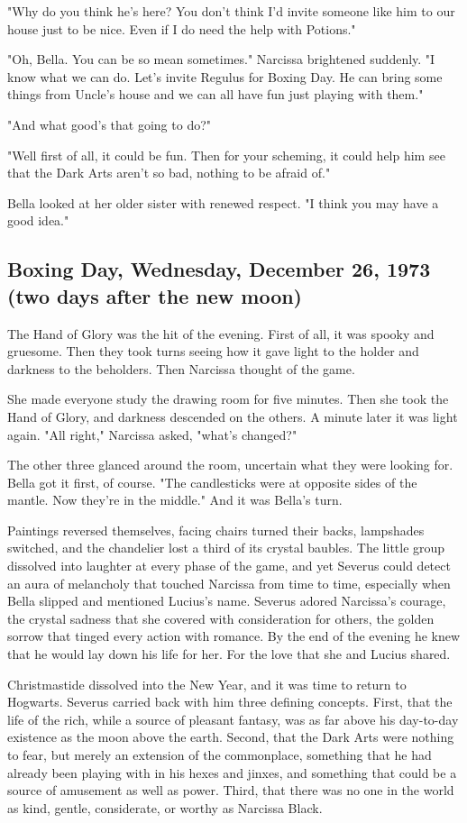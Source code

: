 \documentclass[a4paper,11pt]{article}
\begin{document}
"Why do you think he's here? You don't think I'd invite someone like him to our house just to be nice. Even if I do need the help with Potions."

"Oh, Bella. You can be so mean sometimes." Narcissa brightened suddenly. "I know what we can do. Let's invite Regulus for Boxing Day. He can bring some things from Uncle's house and we can all have fun just playing with them."

"And what good's that going to do?"

"Well first of all, it could be fun. Then for your scheming, it could help him see that the Dark Arts aren't so bad, nothing to be afraid of."

Bella looked at her older sister with renewed respect. "I think you may have a good idea."

\subsection{Boxing Day, Wednesday, December 26, 1973 (two days after the new moon)}

The Hand of Glory was the hit of the evening. First of all, it was spooky and gruesome. Then they took turns seeing how it gave light to the holder and darkness to the beholders. Then Narcissa thought of the game.

She made everyone study the drawing room for five minutes. Then she took the Hand of Glory, and darkness descended on the others. A minute later it was light again. "All right," Narcissa asked, "what's changed?"

The other three glanced around the room, uncertain what they were looking for. Bella got it first, of course. "The candlesticks were at opposite sides of the mantle. Now they're in the middle." And it was Bella's turn.

Paintings reversed themselves, facing chairs turned their backs, lampshades switched, and the chandelier lost a third of its crystal baubles. The little group dissolved into laughter at every phase of the game, and yet Severus could detect an aura of melancholy that touched Narcissa from time to time, especially when Bella slipped and mentioned Lucius's name. Severus adored Narcissa's courage, the crystal sadness that she covered with consideration for others, the golden sorrow that tinged every action with romance. By the end of the evening he knew that he would lay down his life for her. For the love that she and Lucius shared.

Christmastide dissolved into the New Year, and it was time to return to Hogwarts. Severus carried back with him three defining concepts. First, that the life of the rich, while a source of pleasant fantasy, was as far above his day-to-day existence as the moon above the earth. Second, that the Dark Arts were nothing to fear, but merely an extension of the commonplace, something that he had already been playing with in his hexes and jinxes, and something that could be a source of amusement as well as power. Third, that there was no one in the world as kind, gentle, considerate, or worthy as Narcissa Black.
\end{document}

